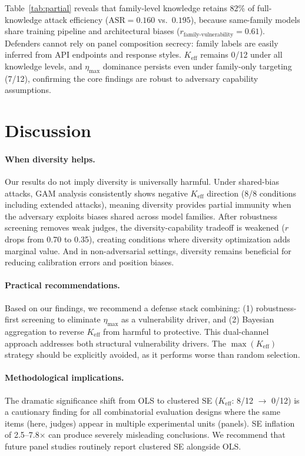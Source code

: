 \documentclass[11pt,a4paper]{article}
\begin{document}
Table~\ref{tab:partial} reveals that family-level knowledge retains 82\% of full-knowledge attack efficiency ($\text{ASR} = 0.160$ vs.\ $0.195$), because same-family models share training pipeline and architectural biases ($r_{\text{family-vulnerability}} = 0.61$). Defenders cannot rely on panel composition secrecy: family labels are easily inferred from API endpoints and response styles. $K_{\text{eff}}$ remains 0/12 under all knowledge levels, and $\eta_{\max}$ dominance persists even under family-only targeting (7/12), confirming the core findings are robust to adversary capability assumptions.

\section{Discussion}

\paragraph{When diversity helps.} Our results do not imply diversity is universally harmful. Under shared-bias attacks, GAM analysis consistently shows negative $K_{\text{eff}}$ direction (8/8 conditions including extended attacks), meaning diversity provides partial immunity when the adversary exploits biases shared across model families. After robustness screening removes weak judges, the diversity-capability tradeoff is weakened ($r$ drops from 0.70 to 0.35), creating conditions where diversity optimization adds marginal value. And in non-adversarial settings, diversity remains beneficial for reducing calibration errors and position biases.

\paragraph{Practical recommendations.} Based on our findings, we recommend a defense stack combining: (1) robustness-first screening to eliminate $\eta_{\max}$ as a vulnerability driver, and (2) Bayesian aggregation to reverse $K_{\text{eff}}$ from harmful to protective. This dual-channel approach addresses both structural vulnerability drivers. The $\max(K_{\text{eff}})$ strategy should be explicitly avoided, as it performs worse than random selection.

\paragraph{Methodological implications.} The dramatic significance shift from OLS to clustered SE ($K_{\text{eff}}$: 8/12 $\to$ 0/12) is a cautionary finding for all combinatorial evaluation designs where the same items (here, judges) appear in multiple experimental units (panels). SE inflation of 2.5--7.8$\times$ can produce severely misleading conclusions. We recommend that future panel studies routinely report clustered SE alongside OLS.
\end{document}
